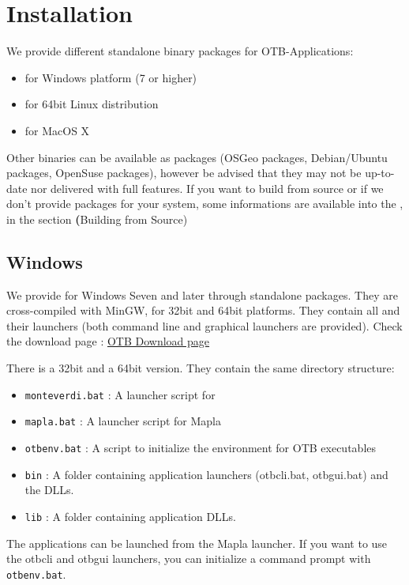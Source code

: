 \section{Installation}\label{sec:appinstall}

We provide different standalone binary packages for OTB-Applications:
\begin{itemize}
\item for Windows platform (7 or higher)
\item for 64bit Linux distribution
\item for MacOS X
\end{itemize}

Other binaries can be available as packages (OSGeo packages, Debian/Ubuntu packages,
OpenSuse packages), however be advised that they may not be up-to-date nor delivered
with full features.
If you want to build from source or if we don't provide packages for your system,
some informations are available into the \sg, in the section \textbf(Building from Source)

\subsection{Windows}

We provide \app for Windows Seven and later through standalone packages.
They are cross-compiled with MinGW, for 32bit and 64bit platforms.
They contain all \app and their launchers (both command line and graphical
launchers are provided). Check the download page :
\href{https://www.orfeo-toolbox.org/download}{OTB Download page}

There is a 32bit and a 64bit version. They contain the same directory structure:
\begin{itemize}
\item \verb?monteverdi.bat? : A launcher script for \mont
\item \verb?mapla.bat? : A launcher script for Mapla
\item \verb?otbenv.bat? : A script to initialize the environment for OTB executables
\item \verb?bin? : A folder containing application launchers (otbcli\textunderscore *.bat,
otbgui\textunderscore *.bat) and the DLLs.
\item \verb?lib? : A folder containing application DLLs.
\end{itemize}

The applications can be launched from the Mapla launcher. If you want to use
the otbcli and otbgui launchers, you can initialize a command prompt
with \verb?otbenv.bat?.

